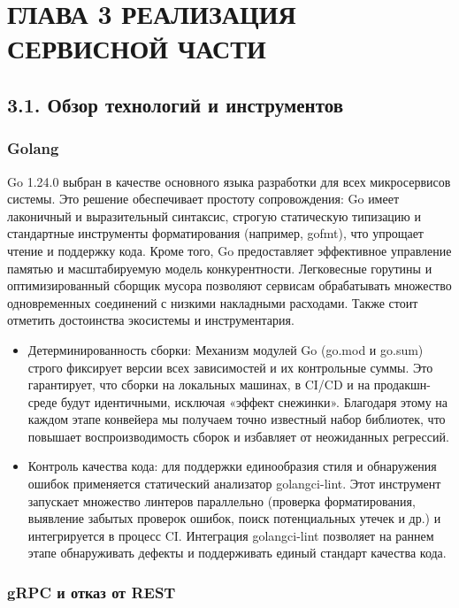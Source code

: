 \section{ГЛАВА 3 РЕАЛИЗАЦИЯ СЕРВИСНОЙ ЧАСТИ}

\subsection*{3.1. Обзор технологий и инструментов}

\subsubsection*{Golang}

Go 1.24.0 выбран в качестве основного языка разработки для всех микросервисов системы. Это решение обеспечивает простоту сопровождения: Go имеет лаконичный и выразительный синтаксис, строгую статическую типизацию и стандартные инструменты форматирования (например, gofmt), что упрощает чтение и поддержку кода. Кроме того, Go предоставляет эффективное управление памятью и масштабируемую модель конкурентности. Легковесные горутины и оптимизированный сборщик мусора позволяют сервисам обрабатывать множество одновременных соединений с низкими накладными расходами. Также стоит отметить достоинства экосистемы и инструментария.

\begin{itemize}
    \item Детерминированность сборки: Механизм модулей Go (go.mod и go.sum) строго фиксирует версии всех зависимостей и их контрольные суммы. Это гарантирует, что сборки на локальных машинах, в CI/CD и на продакшн-среде будут идентичными, исключая «эффект снежинки». Благодаря этому на каждом этапе конвейера мы получаем точно известный набор библиотек, что повышает воспроизводимость сборок и избавляет от неожиданных регрессий.
    \item Контроль качества кода: для поддержки единообразия стиля и обнаружения ошибок применяется статический анализатор golangci-lint. Этот инструмент запускает множество линтеров параллельно (проверка форматирования, выявление забытых проверок ошибок, поиск потенциальных утечек и др.) и интегрируется в процесс CI. Интеграция golangci-lint позволяет на раннем этапе обнаруживать дефекты и поддерживать единый стандарт качества кода.
\end{itemize}

\subsubsection*{gRPC и отказ от REST}


